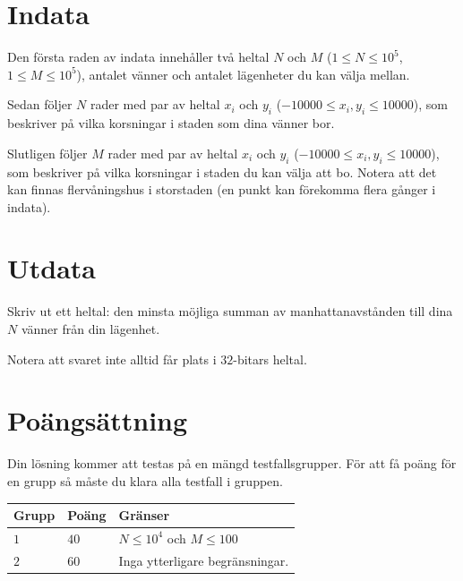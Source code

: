 \section*{Indata}
Den första raden av indata innehåller två heltal $N$ och $M$ ($1 \leq N \leq 10^5$, $1 \leq M \leq 10^5$), antalet vänner
och antalet lägenheter du kan välja mellan.

Sedan följer $N$ rader med par av heltal $x_i$ och $y_i$ ($-10 000 \leq x_i, y_i \leq 10 000$), som beskriver på
vilka korsningar i staden som dina vänner bor.

Slutligen följer $M$ rader med par av heltal $x_i$ och $y_i$ ($-10 000 \leq x_i, y_i \leq 10 000$),
som beskriver på vilka korsningar i staden du kan välja att bo.
Notera att det kan finnas flervåningshus i storstaden (en punkt kan förekomma flera gånger i indata).

\section*{Utdata}
Skriv ut ett heltal: den minsta möjliga summan av manhattanavstånden till dina $N$ vänner från din lägenhet.

Notera att svaret inte alltid får plats i $32$-bitars heltal.

\section*{Poängsättning}
Din lösning kommer att testas på en mängd testfallsgrupper.
För att få poäng för en grupp så måste du klara alla testfall i gruppen.

\noindent
\begin{tabular}{| l | l | p{12cm} |}
  \hline
  \textbf{Grupp} & \textbf{Poäng} & \textbf{Gränser} \\ \hline
  $1$   & $40$       & $N \leq 10^4$ och $M \leq 100$ \\ \hline
  $2$   & $60$       & Inga ytterligare begränsningar.\\ \hline
\end{tabular}
